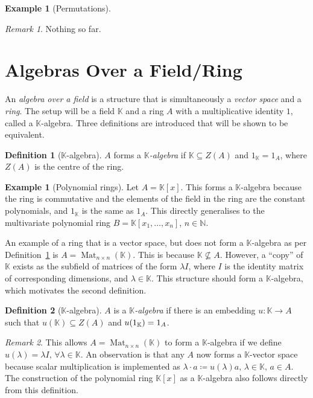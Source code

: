 \documentclass[svgnames]{article}
\theoremstyle{definition}
\newtheorem{Definition}{Definition}
\newtheorem{Example}{Example}
\newtheorem*{Example*}{Example}
\theoremstyle{remark}
\newtheorem*{Remark*}{Remark}
\theoremstyle{underline}
\theoremstyle{underline}
\DeclareMathOperator{\Mat}{Mat}
\begin{document}
\begin{Example}[Permutations]
		\begin{Remark*}
			Nothing so far.
		\end{Remark*}
	\end{Example}
	
	\section{Algebras Over a Field/Ring}
	
	An \emph{algebra over a field} is a structure that is simultaneously a \emph{vector space} and a \emph{ring}. The setup will be a field $\mathbb K$ and a ring $A$ with a multiplicative identity $1$, called a $\mathbb K$-algebra.
	Three definitions are introduced that will be shown to be equivalent.
	
	\begin{Definition}[$\mathbb K$-algebra]\label{def:k-Alg-1}
		$A$ forms a $\mathbb K$\emph{-algebra} if $\mathbb K \subseteq Z(A)$ and $1_{\mathbb K} = 1_A$, where $Z(A)$ is the centre of the ring.
	\end{Definition}
	
	\begin{Example*}[Polynomial rings]
		Let $A = \mathbb K[x]$. This forms a $\mathbb K$-algebra because the ring is commutative and the elements of the field in the ring are the constant polynomials, and $1_{\mathbb K}$ is the same as $1_A$. This directly generalises to the multivariate polynomial ring $B = \mathbb K[x_1,\ldots,x_n]$, $n \in \mathbb N$.
	\end{Example*}
	
	An example of a ring that is a vector space, but does not form a $\mathbb K$-algebra as per Definition~\ref{def:k-Alg-1} is $A = \Mat_{n\times n}(\mathbb K)$. This is because $\mathbb K \not\subseteq A$. However, a ``copy'' of $\mathbb K$ exists as the subfield of matrices of the form $\lambda I$, where $I$ is the identity matrix of corresponding dimensions, and $\lambda \in \mathbb K$. This structure should form a $\mathbb K$-algebra, which motivates the second definition.
	
	\begin{Definition}[$\mathbb K$-algebra]
		$A$ is a $\mathbb K$\emph{-algebra} if there is an embedding $u \colon \mathbb K \to A$ such that $u(\mathbb K) \subseteq Z(A)$ and $u\pqty{1_{\mathbb K}} = 1_A $.
	\end{Definition}
	
	\begin{Remark*}
		This allows $A = \Mat_{n\times n}(\mathbb K)$ to form a $\mathbb K$-algebra if we define $u(\lambda) = \lambda I,\, \forall \lambda \in \mathbb K$. An observation is that any $A$ now forms a $\mathbb K$-vector space because scalar multiplication is implemented as $\lambda \cdot a \coloneqq u(\lambda)a,\, \lambda \in \mathbb K,\, a \in A$. The construction of the polynomial ring $\mathbb K[x]$ as a $\mathbb K$-algebra also follows directly from this definition.
	\end{Remark*}
	
\end{document}
